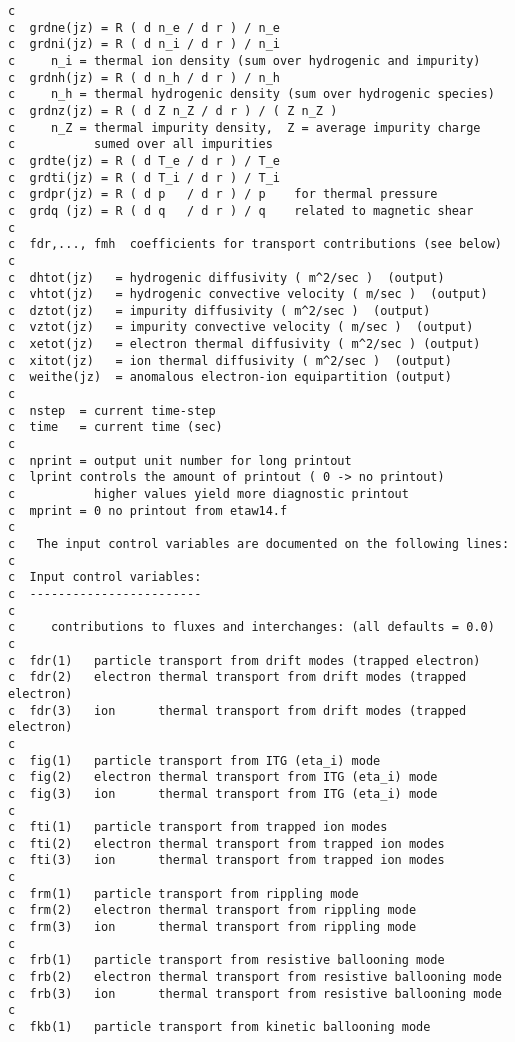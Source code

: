 \begin{verbatim}
c
c  grdne(jz) = R ( d n_e / d r ) / n_e
c  grdni(jz) = R ( d n_i / d r ) / n_i
c     n_i = thermal ion density (sum over hydrogenic and impurity)
c  grdnh(jz) = R ( d n_h / d r ) / n_h
c     n_h = thermal hydrogenic density (sum over hydrogenic species)
c  grdnz(jz) = R ( d Z n_Z / d r ) / ( Z n_Z )
c     n_Z = thermal impurity density,  Z = average impurity charge
c           sumed over all impurities
c  grdte(jz) = R ( d T_e / d r ) / T_e
c  grdti(jz) = R ( d T_i / d r ) / T_i
c  grdpr(jz) = R ( d p   / d r ) / p    for thermal pressure
c  grdq (jz) = R ( d q   / d r ) / q    related to magnetic shear
c
c  fdr,..., fmh  coefficients for transport contributions (see below)
c
c  dhtot(jz)   = hydrogenic diffusivity ( m^2/sec )  (output)
c  vhtot(jz)   = hydrogenic convective velocity ( m/sec )  (output)
c  dztot(jz)   = impurity diffusivity ( m^2/sec )  (output)
c  vztot(jz)   = impurity convective velocity ( m/sec )  (output)
c  xetot(jz)   = electron thermal diffusivity ( m^2/sec ) (output)
c  xitot(jz)   = ion thermal diffusivity ( m^2/sec )  (output)
c  weithe(jz)  = anomalous electron-ion equipartition (output)
c
c  nstep  = current time-step
c  time   = current time (sec)
c
c  nprint = output unit number for long printout
c  lprint controls the amount of printout ( 0 -> no printout)
c           higher values yield more diagnostic printout
c  mprint = 0 no printout from etaw14.f
c
c   The input control variables are documented on the following lines:
c
c  Input control variables:
c  ------------------------
c
c     contributions to fluxes and interchanges: (all defaults = 0.0)
c
c  fdr(1)   particle transport from drift modes (trapped electron)
c  fdr(2)   electron thermal transport from drift modes (trapped electron)
c  fdr(3)   ion      thermal transport from drift modes (trapped electron)
c
c  fig(1)   particle transport from ITG (eta_i) mode
c  fig(2)   electron thermal transport from ITG (eta_i) mode
c  fig(3)   ion      thermal transport from ITG (eta_i) mode
c
c  fti(1)   particle transport from trapped ion modes
c  fti(2)   electron thermal transport from trapped ion modes
c  fti(3)   ion      thermal transport from trapped ion modes
c
c  frm(1)   particle transport from rippling mode
c  frm(2)   electron thermal transport from rippling mode
c  frm(3)   ion      thermal transport from rippling mode
c
c  frb(1)   particle transport from resistive ballooning mode
c  frb(2)   electron thermal transport from resistive ballooning mode
c  frb(3)   ion      thermal transport from resistive ballooning mode
c
c  fkb(1)   particle transport from kinetic ballooning mode

\end{verbatim}
